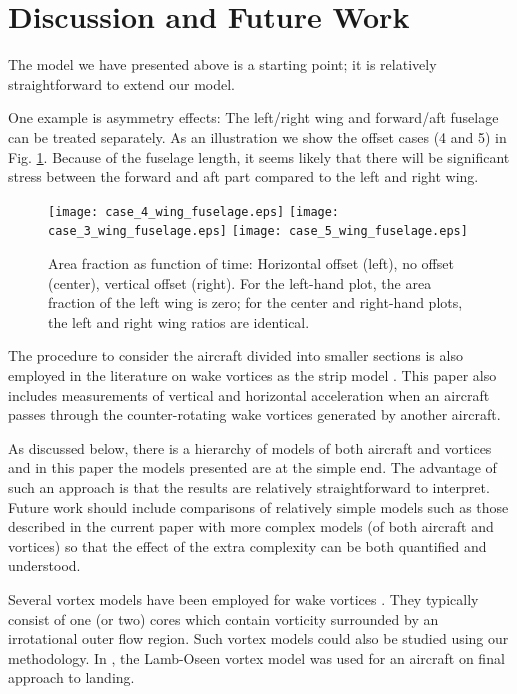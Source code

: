 \documentclass[smallextended]{svjour3}       %
\begin{document}
\section{Discussion and Future Work}

The model we have presented above is a starting point; it is relatively straightforward to extend our model.

One example is asymmetry effects: The left/right wing and forward/aft fuselage can be treated separately. As an illustration we show the offset cases (4 and 5) in Fig. \ref{fig:offset_wing_fuselage}. Because of the fuselage length, it seems likely that there will be significant stress between the forward and aft part compared to the left and right wing.

\begin{figure}
\texttt{[image: case\_4\_wing\_fuselage.eps]}
\hspace{0.5cm}
\texttt{[image: case\_3\_wing\_fuselage.eps]}
\hspace{0.5cm}
\texttt{[image: case\_5\_wing\_fuselage.eps]}
\caption{Area fraction as function of time:  Horizontal offset (left), no offset (center), vertical offset (right). For the left-hand plot, the area fraction of the left wing is zero; for the center and right-hand plots, the left and right wing ratios are identical.}
\label{fig:offset_wing_fuselage}
\end{figure}

The procedure to consider the aircraft divided into smaller sections is also employed in the literature on wake vortices as the strip model \citep{hahn_a}. This paper also includes measurements of vertical and horizontal acceleration when an aircraft passes through the counter-rotating wake vortices generated by another aircraft.

As discussed below, there is a hierarchy of models of both aircraft and vortices and in this paper the models presented are at the simple end. The advantage of such an approach is that the results are relatively straightforward to interpret. Future work should include comparisons of relatively simple models such as those described in the current paper with more complex models (of both aircraft and vortices) so that the effect of the extra complexity can be both quantified and understood.

Several vortex models have been employed for wake vortices \citep{gerz_a,ahmad_a}. They typically consist of one (or two) cores which contain vorticity surrounded by an irrotational outer flow region. Such vortex models could also be studied using our methodology. In \citep{spilman_a}, the Lamb-Oseen vortex model was used for an aircraft on final approach to landing.
\end{document}
